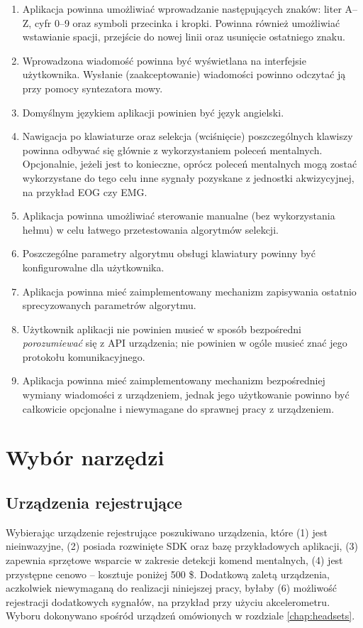 \documentclass[skorowidz,skroty]{dyplomWEZUT}
\begin{document}
\begin{enumerate}
    \item Aplikacja powinna umożliwiać wprowadzanie następujących znaków: liter A--Z, cyfr 0--9 oraz symboli przecinka i kropki. Powinna również umożliwiać wstawianie spacji, przejście do nowej linii oraz usunięcie ostatniego znaku.
    \item Wprowadzona wiadomość powinna być wyświetlana na interfejsie użytkownika. Wysłanie (zaakceptowanie) wiadomości powinno odczytać ją przy pomocy syntezatora mowy.
    \item Domyślnym językiem aplikacji powinien być język angielski.
    \item Nawigacja po klawiaturze oraz selekcja (wciśnięcie) poszczególnych klawiszy powinna odbywać się głównie z wykorzystaniem poleceń mentalnych. Opcjonalnie, jeżeli jest to konieczne, oprócz poleceń mentalnych mogą zostać wykorzystane do tego celu inne sygnały pozyskane z jednostki akwizycyjnej, na przykład EOG czy EMG.
    \item Aplikacja powinna umożliwiać sterowanie manualne (bez wykorzystania hełmu) w celu łatwego przetestowania algorytmów selekcji.
    \item Poszczególne parametry algorytmu obsługi klawiatury powinny być konfigurowalne dla użytkownika.
    \item Aplikacja powinna mieć zaimplementowany mechanizm zapisywania ostatnio sprecyzowanych parametrów algorytmu.
    \item Użytkownik aplikacji nie powinien musieć w sposób bezpośredni \textit{porozumiewać} się z API urządzenia; nie powinien w ogóle musieć znać jego protokołu komunikacyjnego.
    \item Aplikacja powinna mieć zaimplementowany mechanizm bezpośredniej wymiany wiadomości z urządzeniem, jednak jego użytkowanie powinno być całkowicie opcjonalne i niewymagane do sprawnej pracy z urządzeniem.
\end{enumerate}

\section{Wybór narzędzi}
\subsection{Urządzenia rejestrujące}
Wybierając urządzenie rejestrujące poszukiwano urządzenia, które (1) jest nieinwazyjne, (2) posiada rozwinięte SDK oraz bazę przykładowych aplikacji, (3) zapewnia sprzętowe wsparcie w zakresie detekcji komend mentalnych, (4) jest przystępne cenowo -- kosztuje poniżej 500 \$. Dodatkową zaletą urządzenia, aczkolwiek niewymaganą do realizacji niniejszej pracy, byłaby (6) możliwość rejestracji dodatkowych sygnałów, na przykład przy użyciu akcelerometru. Wyboru dokonywano spośród urządzeń omówionych w rozdziale \vref{chap:headsets}.
\end{document}
